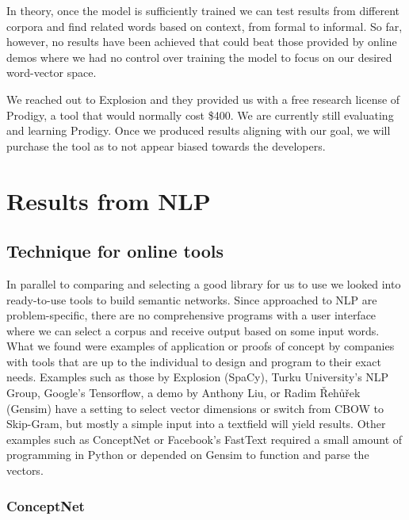 \documentclass[12pt, usenames, dvipsnames]{report}
\begin{document}
\begin{flushleft}
In theory, once the model is sufficiently trained we can test results from different corpora and find related words based on context, from formal to informal.
So far, however, no results have been achieved that could beat those provided by online demos where we had no control over training the model to focus on our desired word-vector space.

We reached out to Explosion and they provided us with a free research license of Prodigy, a tool that would normally cost \$400.
We are currently still evaluating and learning Prodigy.
Once we produced results aligning with our goal, we will purchase the tool as to not appear biased towards the developers.


\chapter{Results from NLP}
\section{Technique for online tools}

In parallel to comparing and selecting a good library for us to use we looked into ready-to-use tools to build semantic networks.
Since approached to NLP are problem-specific, there are no comprehensive programs with a user interface where we can select a corpus and receive output based on some input words. 
What we found were examples of application or proofs of concept by companies with tools that are up to the individual to design and program to their exact needs.
Examples such as those by Explosion (SpaCy), Turku University’s NLP Group, Google’s Tensorflow, a demo by Anthony Liu, or Radim Řehůřek (Gensim) have a setting to select vector dimensions or switch from CBOW to Skip-Gram, but mostly a simple input into a textfield will yield results.
Other examples such as ConceptNet or Facebook’s FastText required a small amount of programming in Python or depended on Gensim to function and parse the vectors.

\subsection{ConceptNet}


\end{flushleft}
\end{document}
